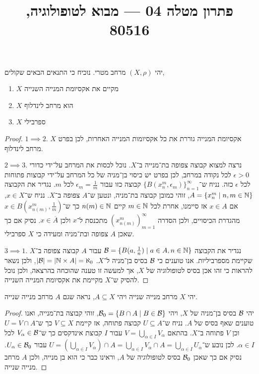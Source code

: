 
\title{פתרון מטלה 04 --- מבוא לטופולוגיה, 80516}


\maketitle
\maketitleprint{}

\question{}
יהי $(X, \rho)$ מרחב מטרי.
נוכיח כי התנאים הבאים שקולים,
\begin{enumerate}
	\item $X$ מקיים את אקסיומת המנייה השנייה
	\item $X$ הוא מרחב לינדלוף
	\item $X$ ספרבילי
\end{enumerate}
\begin{proof}
	$1 \implies 2$.
	אקסיומת המנייה גוררת את כל אקסיומות המנייה האחרות, לכן בפרט $X$ מרחב לינדלוף.

	$2 \implies 3$.
	נרצה למצוא קבוצה צפופה בת־מנייה ב־$X$.
	נוכל לכסות את המרחב על־ידי כדורי $\epsilon > 0$ לכל נקודה במרחב, לכן בפרט יש כיסוי בן־מניה של כל המרחב על־ידי קבוצות פתוחות לכל $\epsilon$ כזה.
	נניח ש־${\{ B(x_n^m, \epsilon_m) \}}_{n = 1}^\infty$ קבוצה כזו עבור $\epsilon_m = \frac{1}{m}$ לכל $m$.
	נגדיר את הקבוצה $A = \{ x_n^m \mid n, m \in \mathbb{N} \}$, זוהי כמובן קבוצה בת־מניה, ונטען ש־$A$ צפופה ב־$X$.
	נניח ש־$x \in X$, אם $x \in A$ אז סיימנו, אחרת לכל $m \in \mathbb{N}$ קיים $n(m) \in \mathbb{N}$ כך ש־$x \in B(x_{n(m)}^m, \frac{1}{m})$ מהגדרת הכיסויים, ולכן הסדרה ${( x_{n(m)}^m )}_{m = 1}^\infty$ מתכנסת ל־$x$ ולכן $x \in \overline{A}$.
	נסיק אם כך שאכן $A$ צפופה ובת־מניה ומעידה כי $X$ ספרבילי.

	$3 \implies 1$.
	נגדיר את הקבוצה $\mathcal{B} = \{ B(a, \frac{1}{n}) \mid a \in A, n \in \mathbb{N} \}$ עבור $A$ קבוצה צפופה ב־$X$ שקיימת מספרביליות.
	אנו טוענים כי $\mathcal{B}$ בסיס בן־מניה ל־$X$.
	$|\mathcal{B}| = |\mathbb{N} \times A| = \aleph_0$, ולכן נשאר להראות כי זהו אכן בסיס לטופולוגיה של $X$, אך למעשה זו טענה שהוכחה בהרצאה, ולכן נוכל להסיק ש־$X$ מקיימת את אקסיומת המנייה השנייה.
\end{proof}

\question{}
\subquestion{}
יהי $X$ מרחב מנייה שנייה ויהי $A \subseteq X$,
נראה שגם $A$ מרחב מנייה שנייה.
\begin{proof}
	יהי $\mathcal{B}$ בסיס בן־מניה של $X$,
	ויהי $\mathcal{B}_0 = \{ B \cap A \mid B \in \mathcal{B} \}$, זוהי קבוצה בת־מנייה, ואנו טוענים שאף בסיס של $A$.
	נניח ש־$U \subseteq A$ קבוצה פתוחה, אז קיימת $V \subseteq X$ כך ש־$U = V \cap A$ וכן $V$ פתוחה ב־$X$.
	בהתאם $V = \bigcup_{\alpha \in I} V_{\alpha}$ עבור $I$ קבוצת אינדקסים כך ש־$V_{\alpha} \in \mathcal{B}$ לכל $\alpha \in I$.
	לכן נובע ש־$U = (\bigcup_{\alpha \in I} V_{\alpha}) \cap A = \bigcup_{\alpha \in I} V_{\alpha} \cap A = \bigcup_{\alpha \in I} U_{\alpha}$ עבור $U_{\alpha} \in \mathcal{B}_0$.
	נסיק אם כך שאכן $\mathcal{B}_0$ בסיס לטופולוגיה של $A$, וראינו כבר כי הוא בן מנייה, ולכן $A$ מרחב מנייה שנייה.
\end{proof}

